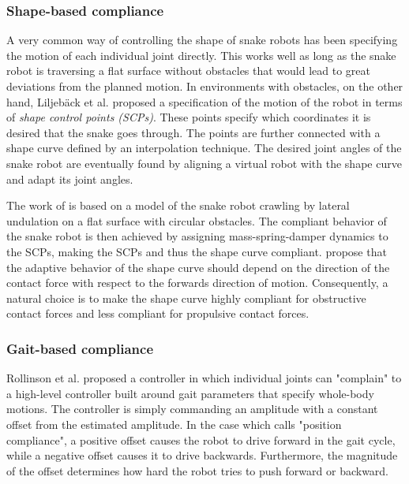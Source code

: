 \subsubsection{Shape-based compliance}

A very common way of controlling the shape of snake robots has been specifying the motion of each individual joint directly. This works well as long as the snake robot is traversing a flat surface without obstacles that would lead to great deviations from the planned motion.
In environments with obstacles, on the other hand, Liljebäck et al. \cite{liljeback2014compliant} proposed a specification of the motion of the robot in terms of \textit{shape control points (SCPs)}. These points specify which coordinates it is desired that the snake goes through. The points are further connected with a shape curve defined by an interpolation technique. The desired joint angles of the snake robot are eventually found by aligning a virtual robot with the shape curve and adapt its joint angles.

The work of \cite{liljeback2014compliant} is based on a model of the snake robot crawling by lateral undulation on a flat surface with circular obstacles. The compliant behavior of the snake robot is then achieved by assigning mass-spring-damper dynamics to the SCPs, making the SCPs and thus the shape curve compliant. \cite{liljeback2014compliant} propose that the adaptive behavior of the shape curve should depend on the direction of the contact force with respect to the forwards direction of motion. Consequently, a natural choice is to make the shape curve highly compliant for obstructive contact forces and less compliant for propulsive contact forces.

\subsubsection{Gait-based compliance}

Rollinson et al. \cite{rollinson2013gait} proposed a controller in which individual joints can "complain" to a high-level controller built around gait parameters that specify whole-body motions. The controller is simply commanding an amplitude with a constant offset from the estimated amplitude. In the case which \cite{rollinson2013gait} calls "position compliance", a positive offset causes the robot to drive forward in the gait cycle, while a negative offset causes it to drive backwards. Furthermore, the magnitude of the offset determines how hard the robot tries to push forward or backward.

